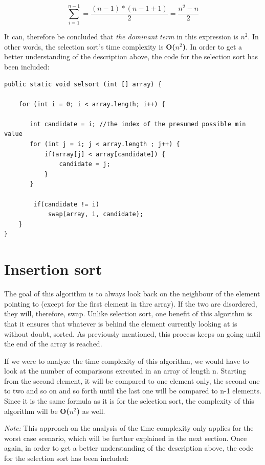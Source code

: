 \documentclass[a4paper,11pt]{article}
\begin{document}
\[ \sum_{i=1}^{n-1} = \frac{(n-1)*(n-1+1)}{2} = \frac{n^2-n}{2}\] 

It can, therefore be concluded that \textit{the dominant term} in this expression is $n^2$. In other words, 
the selection sort's time complexity is \textbf{O($n^2$)}.
In order to get a better understanding of the description above, the code for the selection sort has been included: 


\begin{verbatim}
public static void selsort (int [] array) {
    
    for (int i = 0; i < array.length; i++) {
   
       int candidate = i; //the index of the presumed possible min value
       for (int j = i; j < array.length ; j++) {
           if(array[j] < array[candidate]) {
               candidate = j;
           }
       }
       
        if(candidate != i)
            swap(array, i, candidate);
    }
}
\end{verbatim}
 
 

\section*{Insertion sort}

The goal of this algorithm is to always look back on the neighbour of the element pointing to (except for the first element in thre array).
If the two are disordered, they
will, therefore, swap. Unlike selection sort, one benefit of this algorithm is that it ensures that 
whatever is behind the element currently looking at is without
doubt, sorted. As previously mentioned, this process keeps on going until the end of the array is reached. \newline

If we were to analyze the time complexity of this algorithm, we would have to look at the number of comparisons executed in an array of length n.
Starting from the second element, it will be compared to one element only, the second one to two and so on and so forth until the last one will be compared to 
n-1 elements. Since it is the same formula as it is for the selection sort, the complexity of this algorithm will be \textbf{O($n^2$)} as well. \newline

\textit{Note:} This approach on the analysis of the time complexity only applies for the worst case scenario, which will be further 
explained in the next section.\newline\newline
Once again, in order to get a better understanding of the description above, the code for the selection sort has been included: 
\end{document}
